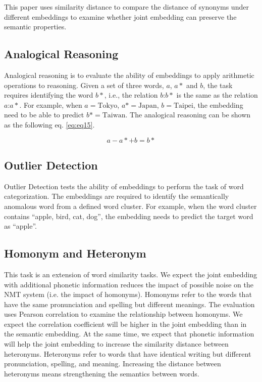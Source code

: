 This paper uses similarity distance to compare the distance of synonyms under different embeddings to examine whether joint embedding can preserve the semantic properties.

\subsection{Analogical Reasoning} \label{sec:analogy}

Analogical reasoning is to evaluate the ability of embeddings to apply arithmetic operations to reasoning. Given a set of three words, $a$, $a*$ and $b$, the task requires identifying the word $b*$, i.e., the relation $b$:$b*$ is the same as the relation $a$:$a*$. For example, when $a=\text{Tokyo}$, $a*=\text{Japan}$, $b=\text{Taipei}$, the embedding need to be able to predict $b*=\text{Taiwan}$. The analogical reasoning can be shown as the following eq. \ref{eq:eq15}.

\begin{equation}
    a - a* + b = b* \label{eq:eq15}
\end{equation}

\subsection{Outlier Detection} \label{sec:outlier}

Outlier Detection tests the ability of embeddings to perform the task of word categorization. The embeddings are required to identify the semantically anomalous word from a defined word cluster. For example, when the word cluster contains ``apple, bird, cat, dog'', the embedding needs to predict the target word as ``apple''.

\subsection{Homonym and Heteronym} \label{sec:homonym_heteronym}

This task is an extension of word similarity tasks. We expect the joint embedding with additional phonetic information reduces the impact of possible noise on the NMT system (i.e. the impact of homonyms). Homonyms refer to the words that have the same pronunciation and spelling but different meanings. The evaluation uses Pearson correlation to examine the relationship between homonyms. We expect the correlation coefficient will be higher in the joint embedding than in the semantic embedding. At the same time, we expect that phonetic information will help the joint embedding to increase the similarity distance between heteronyms. Heteronyms refer to words that have identical writing but different pronunciation, spelling, and meaning. Increasing the distance between heteronyms means strengthening the semantics between words.
